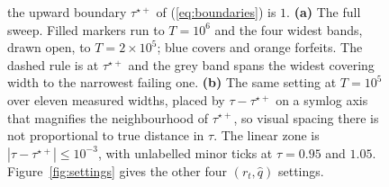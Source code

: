 \begin{figure}[!ht]
{  the upward boundary $\tau^{\star+}$ of (\ref{eq:boundaries}) is $1$. \textbf{(a)} The full
  sweep. Filled markers run to $T = 10^{6}$ and the four widest bands, drawn open, to $T =
  2{\times}10^{5}$; blue covers and orange forfeits. The dashed rule is at $\tau^{\star+}$ and the
  grey band spans the widest covering width to the narrowest failing one.
  \textbf{(b)} The same setting at $T = 10^{5}$ over eleven measured widths, placed by $\tau -
  \tau^{\star+}$ on a symlog axis that magnifies the neighbourhood of $\tau^{\star+}$, so visual
  spacing there is not proportional to true distance in $\tau$. The linear zone is $|\tau -
  \tau^{\star+}| \le 10^{-3}$, with unlabelled minor ticks at $\tau = 0.95$ and $1.05$. Figure~\ref{fig:settings}
  gives the other four $(r_t,\hat{q})$ settings.}
  \label{fig:boundary}
\end{figure}

